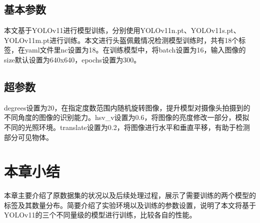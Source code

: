 \subsection{基本参数}
本文基于YOLOv11进行模型训练，分别使用YOLOv11n.pt、YOLOv11s.pt、YOLOv11m.pt进行训练。本文进行头盔佩戴情况检测模型训练时，共有18个标签，在yaml文件里nc设置为18。在训练模型中，将batch设置为16，输入图像的size默认设置为640x640，epochs设置为300。

\subsection{超参数}
degrees设置为20，在指定度数范围内随机旋转图像，提升模型对摄像头拍摄到的不同角度的图像的识别能力。hsv\_v设置为0.6，将图像的亮度修改一部分，模拟不同的光照环境。translate设置为0.2，将图像进行水平和垂直平移，有助于检测部分可见物体。

\section{本章小结}
本章主要介绍了原数据集的状况以及后续处理过程，展示了需要训练的两个模型的标签及其数量分布。简要介绍了实验环境以及训练的参数设置，说明了本文将基于YOLOv11的三个不同量级的模型进行训练，比较各自的性能。








